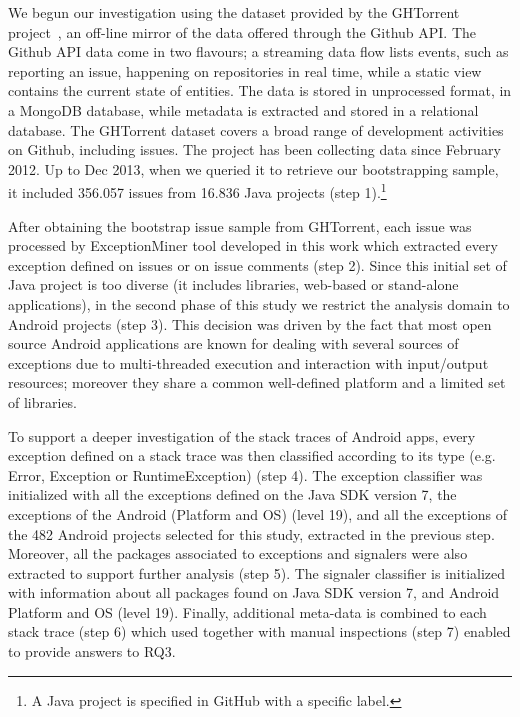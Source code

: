 \documentclass[conference]{IEEEtran}
\begin{document}
We begun our investigation using the dataset provided by the GHTorrent
project~\cite{Gousi13}, an off-line mirror of the data offered through the
Github API. The Github API data come in two flavours; a streaming data flow lists
events, such as reporting an issue, happening on repositories in real time,
while a static view contains the current state of entities. The data is stored
in unprocessed format, in a MongoDB database, while metadata is extracted and
stored in a relational database. The GHTorrent dataset covers a broad range of
development activities on Github, including issues. The project has been
collecting data since February 2012. Up to Dec 2013, when we queried it to
retrieve our bootstrapping sample, it included 356.057 issues from 16.836
Java projects (step 1).\footnote{A Java project is specified in GitHub with a
specific label.}

After obtaining the bootstrap issue sample from GHTorrent, each issue was
processed by ExceptionMiner tool developed in this work which extracted every
exception defined on issues or on issue comments (step 2). Since this initial
set of Java project is too diverse (it includes libraries, web-based or
stand-alone applications), in the second phase of this study we restrict the
analysis domain to Android projects (step 3). This decision was driven by the
fact that most open source Android applications are known for dealing
with several sources of exceptions due to multi-threaded execution and
interaction with input/output resources; moreover they share a common
well-defined platform and a limited set of libraries.

To support a deeper investigation of the stack traces of Android apps, every
exception defined on a stack trace was then classified according to its type
(e.g. Error, Exception or RuntimeException) (step 4). The exception classifier
was initialized with all the exceptions defined on the Java SDK version 7, the
exceptions of the Android (Platform and OS) (level 19), and all the exceptions
of the 482 Android projects selected for this study, extracted in the previous
step. Moreover, all the packages associated to exceptions and signalers were
also extracted to support further analysis (step 5). The signaler classifier is
initialized with information about all packages found on Java SDK version 7, and
Android Platform and OS (level 19). Finally, additional meta-data is combined to
each stack trace (step 6) which used together with manual inspections (step 7)
enabled to provide answers to RQ3.
\end{document}
